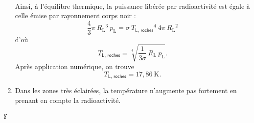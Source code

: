 \documentclass[a4paper, 11pt]{article}
\begin{document}
\begin{multicols}{2}
\begin{enumerate}[start=11]
\begin{align*}
				\end{align*}
				Ainsi, à l'équilibre thermique, la puissance libérée par radioactivité est égale à celle émise par rayonnement corps noir : \[
					\frac{4}{3}\pi\:R_\mathrm{L}{}^3\:p_\mathrm{L} = \sigma\:T_\textsf{L, roches}{}^4\:4\pi\:R_\mathrm{L}{}^2
				\] d'où \[
					\boxed{T_\textsf{L, roches} = \sqrt[4]{\frac{1}{3\sigma}\:R_\mathrm{L}\:p_\mathrm{L}}.}
				\] Après application numérique, on trouve \[
					T_\textsf{L, roches} = 17{,}86\:\mathrm{K}
				.\]
			\item Dans les zones très éclairées, la température n'augmente pas fortement en prenant en compte la radioactivité.
		\end{enumerate}
	\end{multicols}
	\vfill
	\begin{center}
		{
			\selectfont
			\textit{\textbf{\.{\"i}}}
		}
	\end{center}
	\vfill
	\null
\end{document}
